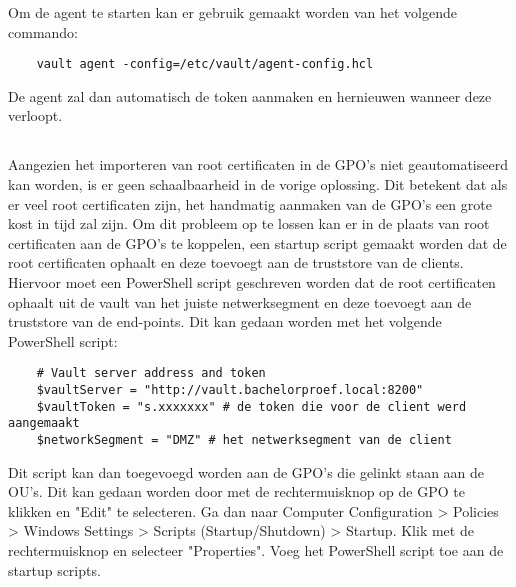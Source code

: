 Om de agent te starten kan er gebruik gemaakt worden van het volgende commando:
\begin{verbatim}
    vault agent -config=/etc/vault/agent-config.hcl
\end{verbatim}

De agent zal dan automatisch de token aanmaken en hernieuwen wanneer deze verloopt.

\subsection{}
\label{subsec:Oplossing_voor_Windows_end-points_door_middel_van_GPOs_met_startup_scripts_en_SCCM}

Aangezien het importeren van root certificaten in de GPO's niet geautomatiseerd kan worden, is er geen schaalbaarheid in de vorige oplossing. Dit betekent dat als er veel root certificaten zijn, het handmatig aanmaken van de GPO's een grote kost in tijd zal zijn.
Om dit probleem op te lossen kan er in de plaats van root certificaten aan de GPO's te koppelen, een startup script gemaakt worden dat de root certificaten ophaalt en deze toevoegt aan de truststore van de clients.
Hiervoor moet een PowerShell script geschreven worden dat de root certificaten ophaalt uit de vault van het juiste netwerksegment en deze toevoegt aan de truststore van de end-points. Dit kan gedaan worden met het volgende PowerShell script:
\begin{verbatim}
    # Vault server address and token
    $vaultServer = "http://vault.bachelorproef.local:8200"
    $vaultToken = "s.xxxxxxx" # de token die voor de client werd aangemaakt
    $networkSegment = "DMZ" # het netwerksegment van de client
\end{verbatim}

Dit script kan dan toegevoegd worden aan de GPO's die gelinkt staan aan de OU's. Dit kan gedaan worden door met de rechtermuisknop op de GPO te klikken en "Edit" te selecteren. Ga dan naar Computer Configuration > Policies > Windows Settings > Scripts (Startup/Shutdown) > Startup. 
Klik met de rechtermuisknop en selecteer "Properties". Voeg het PowerShell script toe aan de startup scripts. \\

